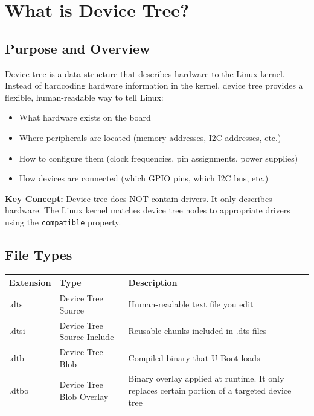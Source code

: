 \documentclass[12pt,a4paper]{report}
\begin{document}
\section{What is Device Tree?}

\subsection{Purpose and Overview}

Device tree is a data structure that describes hardware to the Linux kernel. Instead of hardcoding hardware information in the kernel, device tree provides a flexible, human-readable way to tell Linux:

\begin{itemize}
    \item What hardware exists on the board
    \item Where peripherals are located (memory addresses, I2C addresses, etc.)
    \item How to configure them (clock frequencies, pin assignments, power supplies)
    \item How devices are connected (which GPIO pins, which I2C bus, etc.)
\end{itemize}

\begin{important}
\textbf{Key Concept:} Device tree does NOT contain drivers. It only describes hardware. The Linux kernel matches device tree nodes to appropriate drivers using the \texttt{compatible} property.
\end{important}

\subsection{File Types}

\begin{center}
\begin{tabular}{|l|l|p{6cm}|}
\hline
\textbf{Extension} & \textbf{Type} & \textbf{Description} \\
\hline
.dts & Device Tree Source & Human-readable text file you edit \\
\hline
.dtsi & Device Tree Source Include & Reusable chunks included in .dts files \\
\hline
.dtb & Device Tree Blob & Compiled binary that U-Boot loads \\
\hline
.dtbo & Device Tree Blob Overlay & Binary overlay applied at runtime. It only replaces certain portion of a targeted device tree \\
\hline
\end{tabular}
\end{center}
\end{document}
